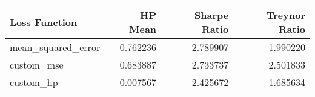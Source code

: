 \begin{tabular}{lrrr}
\toprule
     Loss Function &  HP Mean &  Sharpe Ratio &  Treynor Ratio \\
\midrule
mean\_squared\_error & 0.762236 &      2.789907 &       1.990220 \\
        custom\_mse & 0.683887 &      2.733737 &       2.501833 \\
         custom\_hp & 0.007567 &      2.425672 &       1.685634 \\
\bottomrule
\end{tabular}

